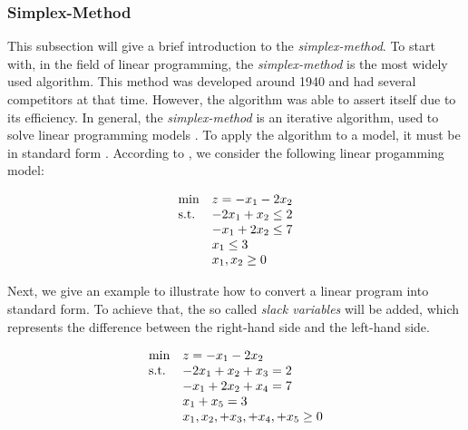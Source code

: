 \subsubsection{Simplex-Method}
This subsection will give a brief introduction to the \textit{simplex-method}. 
To start with, in the field of linear programming, the \textit{simplex-method} 
is the most widely used algorithm. 
This method was developed around 1940 and had several competitors at that time.
However, the algorithm was able to assert itself due to its efficiency. 
In general, the \textit{simplex-method} is an iterative algorithm, used to solve 
linear programming models . To apply the algorithm to a model, 
it must be in standard form . According to , 
we consider the following linear progamming model:

\begin{equation*}
    \begin{array}{ll@{}ll}
        \text{min}  & \displaystyle z = -x_{1} - 2x_{2} &\\
        \text{s.t.}& \displaystyle - 2x_{1} + x_{2} \leq 2 &\\
                    & \displaystyle - x_{1} + 2x_{2} \leq 7 &\\
                    & \displaystyle  x_{1} \leq 3 &\\
                    &                        x_{1}, x_{2} \geq 0
    \end{array}
\end{equation*}

Next, we give an example to illustrate how to convert a linear program into standard form.
To achieve that, the so called \textit{slack variables} will be added, which represents the 
difference between the right-hand side and the left-hand side. 

\begin{equation*}
    \begin{array}{ll@{}ll}
        \text{min}  & \displaystyle z = -x_{1} - 2x_{2} &\\
        \text{s.t.}& \displaystyle - 2x_{1} + x_{2} + x_{3} = 2 &\\
                    & \displaystyle - x_{1} + 2x_{2} + x_{4} = 7 &\\
                    & \displaystyle  x_{1} + x_{5} = 3 &\\
                    &                        x_{1}, x_{2}, + x_{3}, + x_{4}, + x_{5} \geq 0
    \end{array}
\end{equation*}



